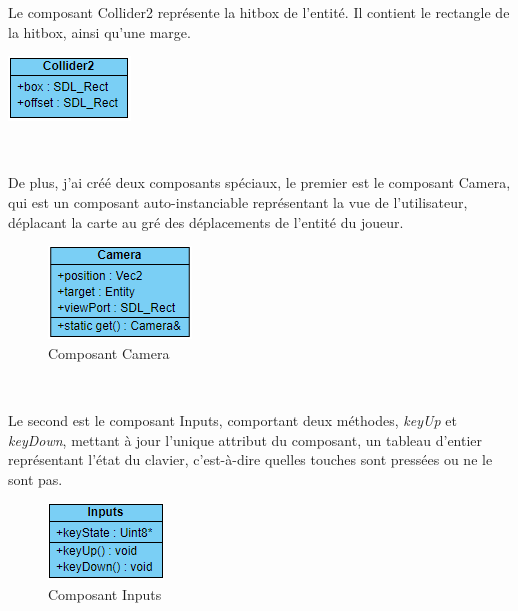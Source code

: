\documentclass[12pt, openany]{report}
\begin{document}
\newpage
\noindent
\begin{minipage}{.6\textwidth}
\par Le composant Collider2 repr\'esente la hitbox de l'entit\'e. Il contient le rectangle de la hitbox, ainsi qu'une marge.
\end{minipage}
\hfill
\begin{minipage}{.35\textwidth}
\includegraphics[width=\textwidth]{collider.png}
\end{minipage}
\\[0.5cm]
\par De plus, j'ai cr\'e\'e deux composants sp\'eciaux, le premier est le composant Camera, qui est un composant auto-instanciable repr\'esentant la vue de l'utilisateur, d\'eplacant la carte au gr\'e des d\'eplacements de l'entit\'e du joueur.
\begin{figure}[!h]
\centering
\includegraphics[scale=1.5]{camera.png}
\caption{Composant Camera}
\end{figure}
\\[0.5cm]
\par Le second est le composant Inputs, comportant deux m\'ethodes, \textit{keyUp} et \textit{keyDown}, mettant \`a jour l'unique attribut du composant, un tableau d'entier repr\'esentant l'\'etat du clavier, c'est-\`a-dire quelles touches sont press\'ees ou ne le sont pas.
\begin{figure}[!h]
\centering
\includegraphics[scale=1.5]{inputs.png}
\caption{Composant Inputs}
\end{figure}
\newpage
\end{document}
